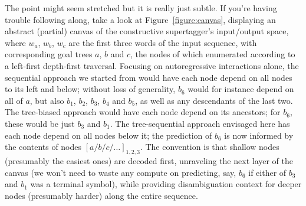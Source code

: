 The point might seem stretched but it is really just subtle.
If you're having trouble following along, take a look at Figure~\ref{figure:canvas}, displaying an abstract (partial) canvas of the constructive supertagger's input/output space, where $w_a$, $w_b$, $w_c$ are the first three words of the input sequence, with corresponding goal trees $a$, $b$ and $c$, the nodes of which enumerated according to a left-first depth-first traversal.
Focusing on autoregressive interactions alone, the sequential approach we started from would have each node depend on all nodes to its left and below; without loss of generality, $b_6$ would for instance depend on all of $a$, but also $b_1$, $b_2$, $b_3$, $b_4$ and $b_5$, as well as any descendants of the last two.
The tree-biased approach would have each node depend on its ancestors; for $b_6$, these would be just $b_3$ and $b_1$.
The tree-sequential approach envisaged here has each node depend on all nodes below it; the prediction of $b_6$ is now informed by the contents of nodes $[a/b/c/\dots]_{1,2,3}$.
The convention is that shallow nodes (presumably the easiest ones) are decoded first, unraveling the next layer of the canvas (we won't need to waste any compute on predicting, say, $b_6$ if either of $b_3$ and $b_1$ was a terminal symbol), while providing disambiguation context for deeper nodes (presumably harder) along the entire sequence.

